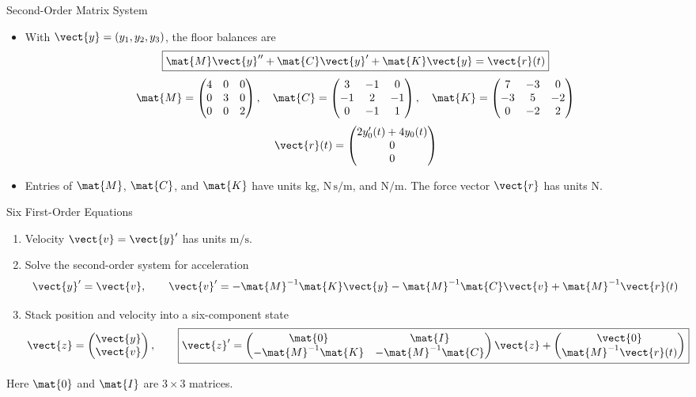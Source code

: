 \begin{frame}{Second-Order Matrix System}
\begin{itemize}
  \item With $\vect{y}=(y_1,y_2,y_3)$, the floor balances are
  \[
    \boxed{\mat{M}\vect{y}''+\mat{C}\vect{y}'+\mat{K}\vect{y}=\vect{r}(t)}
  \]
  \[
    \mat{M}=\begin{pmatrix}4&0&0\\0&3&0\\0&0&2\end{pmatrix},\quad
    \mat{C}=\begin{pmatrix}3&-1&0\\-1&2&-1\\0&-1&1\end{pmatrix},\quad
    \mat{K}=\begin{pmatrix}7&-3&0\\-3&5&-2\\0&-2&2\end{pmatrix}
  \]
  \[
    \vect{r}(t)=\begin{pmatrix}2y_0'(t)+4y_0(t)\\0\\0\end{pmatrix}
  \]
  \item Entries of $\mat{M}$, $\mat{C}$, and $\mat{K}$ have units $\mathrm{kg}$, $\mathrm{N\,s/m}$, and $\mathrm{N/m}$. The force vector $\vect{r}$ has units $\mathrm{N}$.
\end{itemize}
\end{frame}

\begin{frame}{Six First-Order Equations}
\begin{enumerate}
  \item Velocity $\vect{v}=\vect{y}'$ has units $\mathrm{m/s}$.
  \item Solve the second-order system for acceleration
  \[
    \vect{y}'=\vect{v},\qquad
    \vect{v}'=-\mat{M}^{-1}\mat{K}\vect{y}
              -\mat{M}^{-1}\mat{C}\vect{v}+\mat{M}^{-1}\vect{r}(t)
  \]
  \item Stack position and velocity into a six-component state
  \[
    \vect{z}=\begin{pmatrix}\vect{y}\\\vect{v}\end{pmatrix},\qquad
    \boxed{\vect{z}'=
      \begin{pmatrix}\mat{0}&\mat{I}\\-\mat{M}^{-1}\mat{K}&-\mat{M}^{-1}\mat{C}\end{pmatrix}\vect{z}
      +\begin{pmatrix}\vect{0}\\\mat{M}^{-1}\vect{r}(t)\end{pmatrix}}
  \]
\end{enumerate}
Here $\mat{0}$ and $\mat{I}$ are $3\times3$ matrices.
\end{frame}

